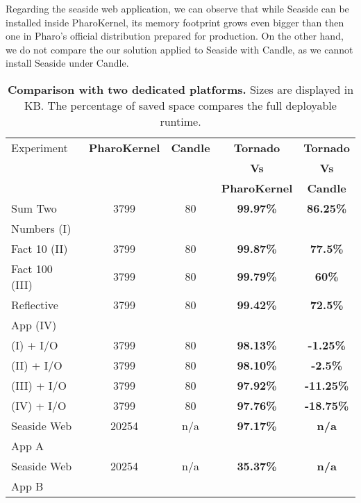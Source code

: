 Regarding the seaside web application, we can observe that while Seaside can be installed inside PharoKernel, its memory footprint grows even bigger than then one in Pharo's official distribution prepared for production. On the other hand, we do not compare the our solution applied to Seaside with Candle, as we cannot install Seaside under Candle.

\begin{table}[ht]
 	\centering
 	\begin{tabular}{lcccc}
		\toprule
			Experiment
 			& \textbf{PharoKernel}
			& \textbf{Candle}
			& \textbf{Tornado}
			& \textbf{Tornado}\\
			
 			& 
			& 
			& \textbf{Vs}
			& \textbf{Vs}\\
			
 			& 
			& 
			& \textbf{PharoKernel}
			& \textbf{Candle}\\
		\toprule
		Sum Two
 			&  3799 & 80 & \textbf{99.97\%} & \textbf{86.25\%}\\
		Numbers (I)
 			& &&&\\
		\midrule
		Fact 10 (II)
 			& 3799 & 80 & \textbf{99.87\%} & \textbf{77.5\%}\\
		\midrule
		Fact 100 (III)
 			& 3799 & 80 & \textbf{99.79\%} & \textbf{60\%}\\
		\midrule
		Reflective
 			& 3799 & 80 & \textbf{99.42\%} & \textbf{72.5\%}\\
		App (IV)&&&&\\
		\midrule
		(I) + I/O
 			& 3799 & 80 & \textbf{98.13\%} & \textbf{-1.25\%}\\
		\midrule
		(II) + I/O
 			& 3799 & 80 & \textbf{98.10\%} & \textbf{-2.5\%}\\
		\midrule
		(III) + I/O
 			& 3799 & 80 & \textbf{97.92\%} & \textbf{-11.25\%}\\
		\midrule
		(IV) + I/O
 			& 3799 & 80 & \textbf{97.76\%} & \textbf{-18.75\%}\\
		\midrule
		Seaside Web
 			& 20254 & n/a & \textbf{97.17\%}  & \textbf{n/a}\\
		App A&&&&\\
		\midrule
		Seaside Web
 			& 20254 & n/a & \textbf{35.37\%}  & \textbf{n/a}\\
		App B&&&&\\
		\bottomrule
 	\end{tabular}
 	\caption{\textbf{Comparison with two dedicated platforms.} Sizes are displayed in KB. The percentage of saved space compares the full deployable runtime.}
 	\label{tb:results_dedicated}
 \end{table}

